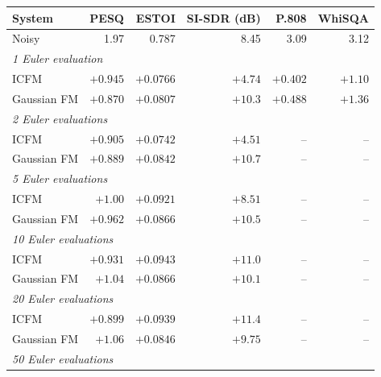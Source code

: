 \begin{table}[htbp]\centering\small
\setlength{\tabcolsep}{4pt}
\begin{tabular}{lrrrrr}\toprule
System & PESQ & ESTOI & SI-SDR (dB) & P.808 & WhiSQA \\ \midrule
Noisy & 1.97 & 0.787 & 8.45 & 3.09 & 3.12 \\
\midrule\multicolumn{6}{l}{\itshape 1 Euler evaluation} \\
ICFM & \cellcolor{bestblue}$+0.945$ & \cellcolor{worstred}$+0.0766$ & \cellcolor{worstred}$+4.74$ & \cellcolor{worstred}$+0.402$ & \cellcolor{worstred}$+1.10$ \\
Gaussian FM & \cellcolor{worstred}$+0.870$ & \cellcolor{bestblue}$+0.0807$ & \cellcolor{bestblue}$+10.3$ & \cellcolor{bestblue}$+0.488$ & \cellcolor{bestblue}$+1.36$ \\
\midrule\multicolumn{6}{l}{\itshape 2 Euler evaluations} \\
ICFM & \cellcolor{bestblue}$+0.905$ & \cellcolor{worstred}$+0.0742$ & \cellcolor{worstred}$+4.51$ & -- & -- \\
Gaussian FM & \cellcolor{worstred}$+0.889$ & \cellcolor{bestblue}$+0.0842$ & \cellcolor{bestblue}$+10.7$ & -- & -- \\
\midrule\multicolumn{6}{l}{\itshape 5 Euler evaluations} \\
ICFM & \cellcolor{bestblue}$+1.00$ & \cellcolor{bestblue}$+0.0921$ & \cellcolor{worstred}$+8.51$ & -- & -- \\
Gaussian FM & \cellcolor{worstred}$+0.962$ & \cellcolor{worstred}$+0.0866$ & \cellcolor{bestblue}$+10.5$ & -- & -- \\
\midrule\multicolumn{6}{l}{\itshape 10 Euler evaluations} \\
ICFM & \cellcolor{worstred}$+0.931$ & \cellcolor{bestblue}$+0.0943$ & \cellcolor{bestblue}$+11.0$ & -- & -- \\
Gaussian FM & \cellcolor{bestblue}$+1.04$ & \cellcolor{worstred}$+0.0866$ & \cellcolor{worstred}$+10.1$ & -- & -- \\
\midrule\multicolumn{6}{l}{\itshape 20 Euler evaluations} \\
ICFM & \cellcolor{worstred}$+0.899$ & \cellcolor{bestblue}$+0.0939$ & \cellcolor{bestblue}$+11.4$ & -- & -- \\
Gaussian FM & \cellcolor{bestblue}$+1.06$ & \cellcolor{worstred}$+0.0846$ & \cellcolor{worstred}$+9.75$ & -- & -- \\
\midrule\multicolumn{6}{l}{\itshape 50 Euler evaluations} \\

\end{tabular}
\end{table}
